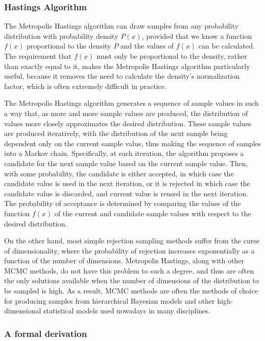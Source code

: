 \subsubsection*{Hastings Algorithm}

The Metropolis Hastings algorithm can draw samples from any probability distribution with probability density \(P(x)\), provided that we know a function \(f(x)\) proportional to the density \(P\) and the values of \(f(x)\) can be calculated. The requirement that \(f(x)\) must only be proportional to the density, rather than exactly equal to it, makes the Metropolis Hastings algorithm particularly useful, because it removes the need to calculate the density's normalization factor, which is often extremely difficult in practice.

The Metropolis Hastings algorithm generates a sequence of sample values in such a way that, as more and more sample values are produced, the distribution of values more closely approximates the desired distribution. These sample values are produced iteratively, with the distribution of the next sample being dependent only on the current sample value, thus making the sequence of samples into a Markov chain. Specifically, at each iteration, the algorithm proposes a candidate for the next sample value based on the current sample value. Then, with some probability, the candidate is either accepted, in which case the candidate value is used in the next iteration, or it is rejected in which case the candidate value is discarded, and current value is reused in the next iteration. The probability of acceptance is determined by comparing the values of the function \( f(x) \) of the current and candidate sample values with respect to the desired distribution.

On the other hand, most simple rejection sampling methods suffer from the curse of dimensionality, where the probability of rejection increases exponentially as a function of the number of dimensions. Metropolis Hastings, along with other MCMC methods, do not have this problem to such a degree, and thus are often the only solutions available when the number of dimensions of the distribution to be sampled is high. As a result, MCMC methods are often the methods of choice for producing samples from hierarchical Bayesian models and other high-dimensional statistical models used nowadays in many disciplines.

\subsubsection*{A formal derivation}

